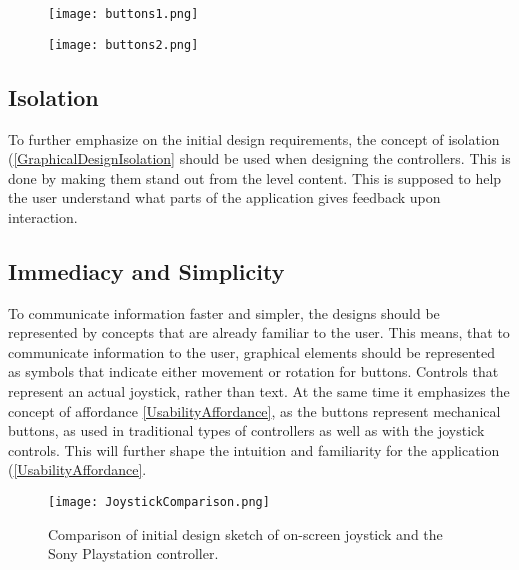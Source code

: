 \begin{figure}[H]
\centering
\begin{minipage}{.5\textwidth}
  \centering
  \texttt{[image: buttons1.png]}
\end{minipage}%
\begin{minipage}{.5\textwidth}
  \centering
  \texttt{[image: buttons2.png]}
\end{minipage}
\end{figure}

\subsection{Isolation}
To further emphasize on the initial design requirements, the concept of isolation (\ref{GraphicalDesignIsolation} should be used when designing the controllers. This is done by making them stand out from the level content. This is supposed to help the user understand what parts of the application gives feedback upon interaction.

\subsection{Immediacy and Simplicity}
To communicate information faster and simpler, the designs should be represented by concepts that are already familiar to the user. This means, that to communicate information to the user, graphical elements should be represented as symbols that indicate either movement or rotation for buttons. Controls that represent an actual joystick, rather than
text. At the same time it emphasizes the concept of affordance \ref{UsabilityAffordance}, as the buttons represent mechanical buttons, as used in traditional types of controllers as well as with the joystick controls. This will further shape the intuition and familiarity for the application (\ref{UsabilityAffordance}.

\begin{figure}[H]
\centering
\texttt{[image: JoystickComparison.png]}
\caption{Comparison of initial design sketch of on-screen joystick and the Sony Playstation controller.}
\end{figure}

